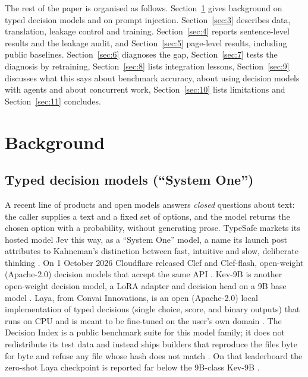 \documentclass[11pt]{article}
\begin{document}
The rest of the paper is organised as follows. Section~\ref{sec:2} gives background on typed decision models and on prompt injection. Section~\ref{sec:3} describes data, translation, leakage control and training. Section~\ref{sec:4} reports sentence-level results and the leakage audit, and Section~\ref{sec:5} page-level results, including public baselines. Section~\ref{sec:6} diagnoses the gap, Section~\ref{sec:7} tests the diagnosis by retraining, Section~\ref{sec:8} lists integration lessons, Section~\ref{sec:9} discusses what this says about benchmark accuracy, about using decision models with agents and about concurrent work, Section~\ref{sec:10} lists limitations and Section~\ref{sec:11} concludes.

\section{Background}\label{sec:2}

\subsection{Typed decision models (``System One'')}\label{sec:2.1}

A recent line of products and open models answers \emph{closed} questions about text: the caller supplies a text and a fixed set of options, and the model returns the chosen option with a probability, without generating prose. TypeSafe markets its hosted model Jev this way, as a ``System One'' model, a name its launch post attributes to Kahneman's distinction between fast, intuitive and slow, deliberate thinking \citep{typesafe2026jev, kahneman2011thinking}. On 1 October 2026 Cloudflare released Clef and Clef-flash, open-weight (Apache-2.0) decision models that accept the same API \citep{cloudflare2026clef, cloudflare2026clefflash}. %
Kev-9B is another open-weight decision model, a LoRA adapter and decision head on a 9B base model \citep{palmer2026kev9b}. Laya, from Convai Innovations, is an open (Apache-2.0) local implementation of typed decisions (single choice, score, and binary outputs) that runs on CPU and is meant to be fine-tuned on the user's own domain \citep{convai2026laya}. %
The Decision Index is a public benchmark suite for this model family; it does not redistribute its test data and instead ships builders that reproduce the files byte for byte and refuse any file whose hash does not match %
\citep{decisionindex2026}. On that leaderboard the zero-shot Laya checkpoint is reported far below the 9B-class Kev-9B \citep{decisionindex2026}. %
\end{document}
